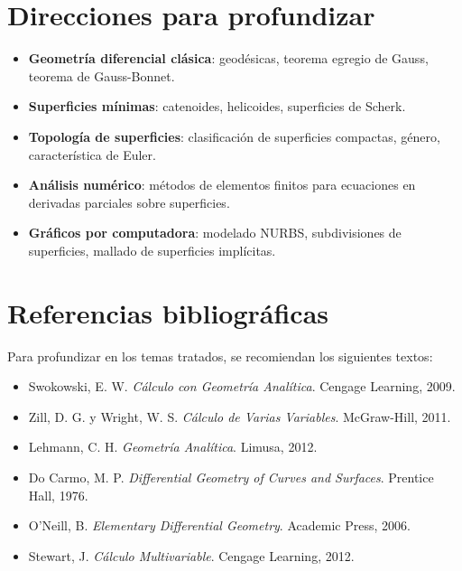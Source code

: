 \documentclass[
]{book}
\providecommand{\tightlist}{%
  \setlength{\itemsep}{0pt}\setlength{\parskip}{0pt}}
\begin{document}
\section{Direcciones para profundizar}\label{direcciones-para-profundizar}

\begin{itemize}
\tightlist
\item
  \textbf{Geometría diferencial clásica}: geodésicas, teorema egregio de Gauss, teorema de Gauss-Bonnet.
\item
  \textbf{Superficies mínimas}: catenoides, helicoides, superficies de Scherk.
\item
  \textbf{Topología de superficies}: clasificación de superficies compactas, género, característica de Euler.
\item
  \textbf{Análisis numérico}: métodos de elementos finitos para ecuaciones en derivadas parciales sobre superficies.
\item
  \textbf{Gráficos por computadora}: modelado NURBS, subdivisiones de superficies, mallado de superficies implícitas.
\end{itemize}

\section{Referencias bibliográficas}\label{referencias-bibliogruxe1ficas}

Para profundizar en los temas tratados, se recomiendan los siguientes textos:

\begin{itemize}
\tightlist
\item
  Swokowski, E. W. \emph{Cálculo con Geometría Analítica}. Cengage Learning, 2009.
\item
  Zill, D. G. y Wright, W. S. \emph{Cálculo de Varias Variables}. McGraw-Hill, 2011.
\item
  Lehmann, C. H. \emph{Geometría Analítica}. Limusa, 2012.
\item
  Do Carmo, M. P. \emph{Differential Geometry of Curves and Surfaces}. Prentice Hall, 1976.
\item
  O'Neill, B. \emph{Elementary Differential Geometry}. Academic Press, 2006.
\item
  Stewart, J. \emph{Cálculo Multivariable}. Cengage Learning, 2012.
\end{itemize}

  
\end{document}
